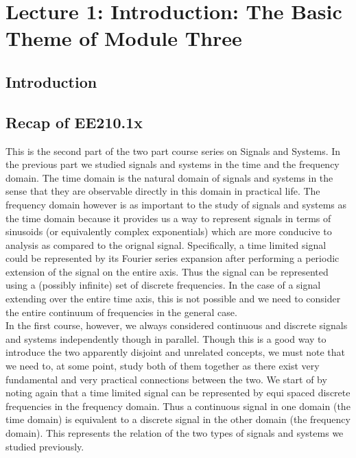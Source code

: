 \section{Lecture 1: Introduction: The Basic Theme of Module Three}

\subsection{Introduction}

\subsection{Recap of EE210.1x}
This is the second part of the two part course series on Signals and Systems. In the previous part we studied signals and systems in the time and the frequency domain. The time domain is the natural domain of signals and systems in the sense that they are observable directly in this domain in practical life. The frequency domain however is as important to the study of signals and systems as the time domain because it provides us a way to represent signals in terms of sinusoids (or equivalently complex exponentials) which are more conducive to analysis as compared to the orignal signal. Specifically, a time limited signal could be represented by its Fourier series expansion after performing a periodic extension of the signal on the entire axis. Thus the signal can be represented using a (possibly infinite) set of discrete frequencies. In the case of a signal extending over the entire time axis, this is not possible and we need to consider the entire continuum of frequencies in the general case.\\

In the first course, however, we always considered continuous and discrete signals and systems independently though in parallel. Though this is a good way to introduce the two apparently disjoint and unrelated concepts, we must note that we need to, at some point, study both of them together as there exist very fundamental and very practical connections between the two. We start of by noting again that a time limited signal can be represented by equi spaced discrete frequencies in the frequency domain. Thus a continuous signal in one domain (the time domain) is equivalent to a discrete signal in the other domain (the frequency domain). This represents the relation of the two types of signals and systems we studied previously.


